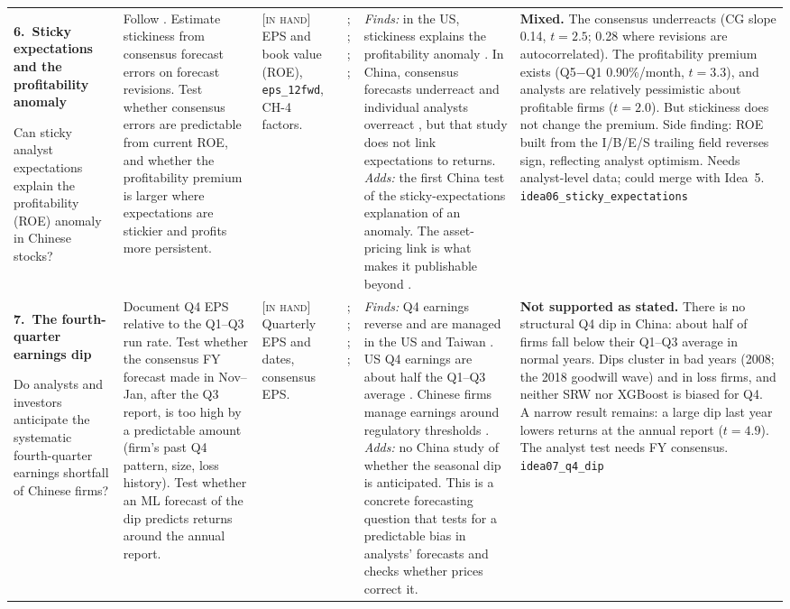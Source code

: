 \documentclass[10pt]{article}
\newcommand{\idea}[2]{\textbf{#1.\ #2}\par\smallskip}
\newcommand{\inhand}{\textsc{[in hand]}}
\begin{document}
{\begin{longtable}{@{}L{3.2cm}L{4.4cm}L{2.5cm}L{3.0cm}L{5.4cm}L{5.8cm}@{}}
\idea{6}{Sticky expectations and the profitability anomaly}
Can sticky analyst expectations explain the profitability (ROE) anomaly in Chinese stocks?
&
Follow \citet{bouchaud2019}. Estimate stickiness from consensus forecast errors on forecast revisions. Test whether
consensus errors are predictable from current ROE, and whether the profitability premium is larger where
expectations are stickier and profits more persistent.
&
\inhand{} EPS and book value (ROE), \texttt{eps\_12fwd}, CH-4 factors.
&
\citet{bouchaud2019}; \citet{coibion2015}; \citet{bordalo2020}; \citet{lili2025}; \citet{liu2019}
&
\emph{Finds:} in the US, stickiness explains the profitability anomaly \citep{bouchaud2019}. In China, consensus
forecasts underreact and individual analysts overreact \citep{lili2025}, but that study does not link expectations to
returns. \emph{Adds:} the first China test of the sticky-expectations explanation of an anomaly. The asset-pricing
link is what makes it publishable beyond \citet{lili2025}.
&
\textbf{Mixed.} The consensus underreacts (CG slope 0.14, $t=2.5$; 0.28 where revisions are autocorrelated). The profitability premium exists (Q5$-$Q1 0.90\%/month, $t=3.3$), and analysts are relatively pessimistic about profitable firms ($t=2.0$). But stickiness does not change the premium. Side finding: ROE built from the I/B/E/S trailing field reverses sign, reflecting analyst optimism. Needs analyst-level data; could merge with Idea~5. \texttt{idea06\_sticky\_expectations}\\[4pt]

\idea{7}{The fourth-quarter earnings dip}
Do analysts and investors anticipate the systematic fourth-quarter earnings shortfall of Chinese firms?
&
Document Q4 EPS relative to the Q1--Q3 run rate. Test whether the consensus FY forecast made in Nov--Jan, after the
Q3 report, is too high by a predictable amount (firm's past Q4 pattern, size, loss history). Test whether an ML
forecast of the dip predicts returns around the annual report.
&
\inhand{} Quarterly EPS and dates, consensus EPS.
&
\citet{das2009}; \citet{jacob2007}; \citet{kapons2024}; \citet{lin2020}; \citet{fan2015}
&
\emph{Finds:} Q4 earnings reverse and are managed in the US and Taiwan \citep{das2009,jacob2007,lin2020}. US Q4
earnings are about half the Q1--Q3 average \citep{kapons2024}. Chinese firms manage earnings around regulatory
thresholds \citep{fan2015}. \emph{Adds:} no China study of whether the seasonal dip is anticipated. This is a
concrete forecasting question that tests for a predictable bias in analysts' forecasts and checks whether prices
correct it.
&
\textbf{Not supported as stated.} There is no structural Q4 dip in China: about half of firms fall below their Q1--Q3 average in normal years. Dips cluster in bad years (2008; the 2018 goodwill wave) and in loss firms, and neither SRW nor XGBoost is biased for Q4. A narrow result remains: a large dip last year lowers returns at the annual report ($t=4.9$). The analyst test needs FY consensus. \texttt{idea07\_q4\_dip}\\[4pt]


\end{longtable}}
\end{document}
